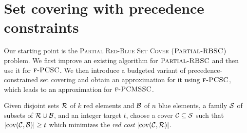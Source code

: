 \section{Set covering with precedence constraints} \label{sec:SC}


Our starting point is the \textup{\textsc{Partial Red-Blue Set Cover}} ($\textup{\textsc{Partial-RBSC}}$) problem.
We first improve an existing algorithm for $\textup{\textsc{Partial-RBSC}}$ and then use it for $\textup{\textsc{f-PCSC}}$. We then introduce a budgeted variant of precedence-constrained set covering and obtain an approximation for it using $\textup{\textsc{f-PCSC}}$, which leads to an approximation for $\textup{\textsc{f-PCMSSC}}$.

\begin{problem} \label{problem:PRBSC}
Given disjoint sets $\mathcal{R}$ of $k$ red elements and $\mathcal{B}$ of $n$ blue elements, a family $\mathcal{S}$ of subsets of $\mathcal{R}\cup\mathcal{B}$, and an integer target $t$, choose a cover $\mathcal{C}\subseteq\mathcal{S}$ such that $\mathopen{}\left| \operatorname{cov}\mathopen{}\left( \mathcal{C},\mathcal{B} \right) \right|\geq t$ which minimizes the \emph{red cost} $\mathopen{}\left| \operatorname{cov}\mathopen{}\left( \mathcal{C},\mathcal{R} \right) \right|$.
\end{problem}


